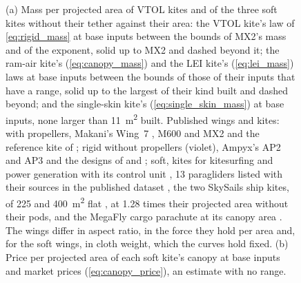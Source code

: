 \begin{figure}[tbp]
\centering
{}
\caption{(a) Mass per projected area of VTOL kites and of the three soft kites without their tether against their area: the VTOL kite's law of \cref{eq:rigid_mass} at base inputs between the bounds of MX2's mass and of the exponent, solid up to MX2 and dashed beyond it; the ram-air kite's (\cref{eq:canopy_mass}) and the LEI kite's (\cref{eq:lei_mass}) laws at base inputs between the bounds of those of their inputs that have a range, solid up to the largest of their kind built and dashed beyond; and the single-skin kite's (\cref{eq:single_skin_mass}) at base inputs, none larger than \SI{11}{m^2} built. Published wings and kites: with propellers, Makani's Wing~7 \citep{vanderlind2013}, M600 and MX2 \citep{echeverri2020part1} and the reference kite of \citet{aull2020}; rigid without propellers (violet), Ampyx's AP2 \citep{sommerfeld2022scaling} and AP3 \citep{joshi2024powercurve} and the designs of \citet{joshi2025} and \citet{eijkelhof2020reference}; soft, kites for kitesurfing \citep{flysurfer_soul4} and power generation with its control unit \citep{schelbergen2020}, 13 paragliders listed with their sources in the published dataset \citep{windshipopt_data}, the two SkySails ship kites, of 225 and \SI{400}{m^2} flat \citep{paulig2013,skysails2018}, at 1.28 times their projected area without their pods, and the MegaFly cargo parachute at its canopy area \citep{dunker2007}. The wings differ in aspect ratio, in the force they hold per area and, for the soft wings, in cloth weight, which the curves hold fixed. (b) Price per projected area of each soft kite's canopy at base inputs and market prices (\cref{eq:canopy_price}), an estimate with no range.}
\label{fig:kite_mass}
\end{figure}

